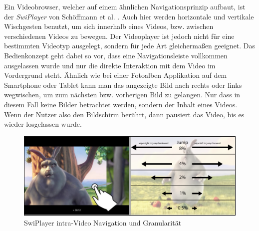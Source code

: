 \documentclass[11pt,a4paper]{report}
\begin{document}
Ein Videobrowser, welcher auf einem ähnlichen Navigationsprinzip aufbaut, ist der \emph{SwiPlayer} von Schöffmann et al. \cite{schoeffmann2014video2}. Auch hier werden horizontale und vertikale Wischgesten benutzt, um sich innerhalb eines Videos, bzw. zwischen verschiedenen Videos zu bewegen. Der Videoplayer ist jedoch nicht für eine bestimmten Videotyp ausgelegt, sondern für jede Art gleichermaßen geeignet. Das Bedienkonzept geht dabei so vor, dass eine Navigationsleiste vollkommen ausgelassen wurde und nur die direkte Interaktion mit dem Video im Vordergrund steht. Ähnlich wie bei einer Fotoalben Applikation auf dem Smartphone oder Tablet kann man das angezeigte Bild nach rechts oder links wegwischen, um zum nächsten bzw. vorherigen Bild zu gelangen. Nur dass in diesem Fall keine Bilder betrachtet werden, sondern der Inhalt eines Videos. Wenn der Nutzer also den Bildschirm berührt, dann pausiert das Video, bis es wieder losgelassen wurde.
\begin{figure}[h]
\begin{center}
\includegraphics[scale=0.9]{./images/15.png}
\caption{SwiPlayer intra-Video Navigation und Granularität \cite{schoeffmann2014video2}}
\label{swiplayer}
\end{center}
\end{figure}
\end{document}
